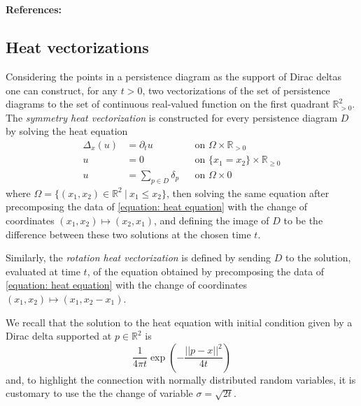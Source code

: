 \documentclass{amsart}
\begin{document}
	\paragraph{\\ References:} \cite{chazal2014stochastic}
	
	\subsection*{Heat vectorizations} \label{heat_vectorization}
	
	Considering the points in a persistence diagram as the support of Dirac deltas one can construct, for any $t > 0$,
	two vectorizations of the set of persistence diagrams to the set of continuous real-valued function on the first quadrant $\mathbb{R}^2_{>0}$. The \textit{symmetry heat vectorization} is constructed for every persistence diagram $D$ by solving the heat equation
	\begin{align} \label{equation: heat equation}
	\Delta_x(u) &= \partial_t u && \text{on } \Omega \times \mathbb R_{>0} \nonumber \\
	u &= 0 && \text{on } \{x_1 = x_2\} \times \mathbb R_{\geq 0} \\
	u &= \sum_{p \in D} \delta_p && \text{on } \Omega \times {0} \nonumber
	\end{align}
	where $\Omega = \{(x_1, x_2) \in \mathbb R^2\ |\ x_1 \leq x_2\}$, then solving the same equation after precomposing the data of \eqref{equation: heat equation} with the change of coordinates $(x_1, x_2) \mapsto (x_2, x_1)$, and defining the image of $D$ to be the difference between these two solutions at the chosen time $t$.
	
	Similarly, the \textit{rotation heat vectorization} is defined by sending $D$ to the solution, evaluated at time $t$, of the equation obtained by precomposing the data of \eqref{equation: heat equation} with the change of coordinates $(x_1, x_2) \mapsto (x_1, x_2-x_1)$.
	
	We recall that the solution to the heat equation with initial condition given by a Dirac delta supported at $p \in \mathbb R^2$ is
	\begin{equation*}
	\frac{1}{4 \pi t} \exp\left(-\frac{||p-x||^2}{4t}\right)
	\end{equation*} 
	and, to highlight the connection with normally distributed random variables, it is customary to use the the change of variable $\sigma = \sqrt{2t}$.
	
\end{document}
